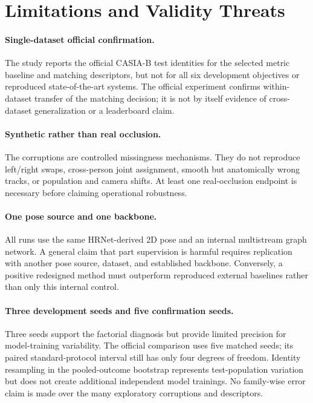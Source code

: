 \documentclass[runningheads]{llncs}
\begin{document}
\section{Limitations and Validity Threats}

\paragraph{Single-dataset official confirmation.}
The study reports the official CASIA-B test identities for the selected metric
baseline and matching descriptors, but not for all six development objectives
or reproduced state-of-the-art systems. The official experiment confirms
within-dataset transfer of the matching decision; it is not by itself evidence
of cross-dataset generalization or a leaderboard claim.

\paragraph{Synthetic rather than real occlusion.}
The corruptions are controlled missingness mechanisms. They do not reproduce
left/right swaps, cross-person joint assignment, smooth but anatomically wrong
tracks, or population and camera shifts. At least one real-occlusion endpoint
is necessary before claiming operational robustness.

\paragraph{One pose source and one backbone.}
All runs use the same HRNet-derived 2D pose and an internal multistream graph
network. A general claim that part supervision is harmful requires replication
with another pose source, dataset, and established backbone. Conversely, a
positive redesigned method must outperform reproduced external baselines rather
than only this internal control.

\paragraph{Three development seeds and five confirmation seeds.}
Three seeds support the factorial diagnosis but provide limited precision for
model-training variability. The official comparison uses five matched seeds;
its paired standard-protocol interval still has only four degrees of freedom.
Identity resampling in the pooled-outcome bootstrap represents test-population
variation but does not create additional independent model trainings. No
family-wise error claim is made over the many exploratory corruptions and
descriptors.
\end{document}
